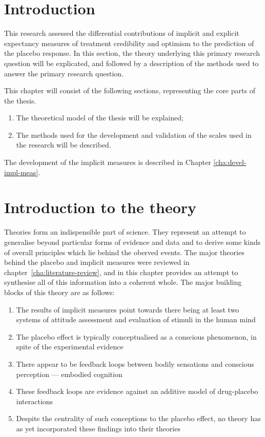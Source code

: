 
\section{Introduction}

This research assessed the differential contributions of implicit and explicit expectancy measures of treatment credibility and optimism to the prediction of the placebo response. 
In this section, the theory underlying this primary research question will be explicated, and followed by a description of the methods used to answer the primary research question. 


This chapter will consist of the following sections, representing the core parts of the thesis.

\begin{enumerate}
\item The theoretical model of the thesis will be explained;
\item The methods used for the development and validation of the scales used in the research will be described.
\end{enumerate}

The development of the implicit measures is described in Chapter \ref{cha:devel-impl-meas}. 

\section{Introduction to the theory}

Theories form an indispensible part of science. They represent an attempt to generalise beyond particular forms of evidence and data and to derive some kinds of overall principles which lie behind the oberved events. The major theories behind the placebo and implicit measures were reviewed in  chapter~\ref{cha:literature-review}, and in this chapter provides  an attempt to synthesise all of this information into a coherent whole. The major building blocks of this theory are as follows:
\begin{enumerate}
\item The results of implicit measures point towards there being at least two systems of attitude assessment and evaluation of stimuli in the human mind%
\item The placebo effect is typically conceptualised as a conscious phenomenon, in spite of the experimental evidence
\item There appear to be feedback loops between bodily sensations and conscious perception --- embodied cognition
\item These feedback loops are evidence against an additive model of drug-placebo interactions
\item Despite the centrality of such conceptions to the placebo effect, no theory has as yet incorporated these findings into their theories
\end{enumerate}

